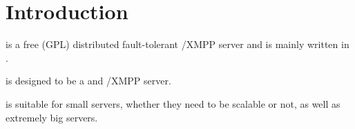 \section{Introduction}
\label{sec:intr}


\ejabberd{} is a free (GPL) distributed fault-tolerant \Jabber{}/XMPP server and is mainly written in .

\ejabberd{} is designed to be a  and  \Jabber{}/XMPP server.

\ejabberd{} is suitable for small servers, whether they need to be scalable or not, as well as extremely big servers.







